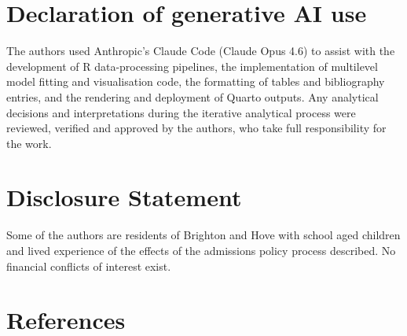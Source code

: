 \documentclass[
  12pt,
  titlepage]{article}
\begin{document}
\section*{Declaration of generative AI
use}\label{declaration-of-generative-ai-use}

The authors used Anthropic's Claude Code (Claude Opus 4.6) to assist
with the development of R data-processing pipelines, the implementation
of multilevel model fitting and visualisation code, the formatting of
tables and bibliography entries, and the rendering and deployment of
Quarto outputs. Any analytical decisions and interpretations during the
iterative analytical process were reviewed, verified and approved by the
authors, who take full responsibility for the work.

\section*{Disclosure Statement}\label{disclosure-statement}

Some of the authors are residents of Brighton and Hove with school aged
children and lived experience of the effects of the admissions policy
process described. No financial conflicts of interest exist.

\section*{References}\label{references}
\end{document}
